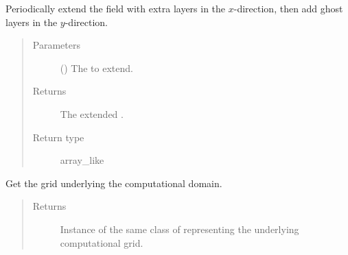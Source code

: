 \documentclass[letterpaper,10pt,english]{sphinxmanual}
\begin{document}
\begin{fulllineitems}
\begin{fulllineitems}
\end{fulllineitems}


\begin{fulllineitems}
\label{\detokenize{api:tasmania.dycore.horizontal_boundary_periodic.PeriodicXZ.from_physical_to_computational_domain}}
Periodically extend the field  with  extra layers in the \(x\)-direction,
then add  ghost layers in the \(y\)-direction.
\begin{quote}\begin{description}
\item[{Parameters}] \leavevmode
{} () \textendash{} The  to extend.

\item[{Returns}] \leavevmode
The extended .

\item[{Return type}] \leavevmode
array\_like

\end{description}\end{quote}

\end{fulllineitems}


\begin{fulllineitems}
\label{\detokenize{api:tasmania.dycore.horizontal_boundary_periodic.PeriodicXZ.get_computational_grid}}
Get the  grid underlying the computational domain.
\begin{quote}\begin{description}
\item[{Returns}] \leavevmode
Instance of the same class of 
representing the underlying computational grid.


\end{description}
\end{quote}
\end{fulllineitems}
\end{fulllineitems}
\end{document}
